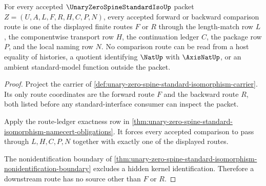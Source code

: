 \begin{theorem}
\label{thm:unary-zero-spine-standard-isomorphism-route-totality}
For every accepted $\UnaryZeroSpineStandardIsoUp$ packet $Z=(U,A,L,F,R,H,C,P,N)$, every accepted forward or backward comparison route is one of the displayed finite routes $F$ or $R$ through the length-match row $L$, the componentwise transport row $H$, the continuation ledger $C$, the package row $P$, and the local naming row $N$. No comparison route can be read from a host equality of histories, a quotient identifying $\NatUp$ with $\AxisNatUp$, or an ambient standard-model function outside the packet.
\end{theorem}
\begin{proof}
Project the carrier of \autoref{def:unary-zero-spine-standard-isomorphism-carrier}. Its only route coordinates are the forward route $F$ and the backward route $R$, both listed before any standard-interface consumer can inspect the packet.

Apply the route-ledger exactness row in \autoref{thm:unary-zero-spine-standard-isomorphism-namecert-obligations}. It forces every accepted comparison to pass through $L,H,C,P,N$ together with exactly one of the displayed routes.

The nonidentification boundary of \autoref{thm:unary-zero-spine-standard-isomorphism-nonidentification-boundary} excludes a hidden kernel identification. Therefore a downstream route has no source other than $F$ or $R$.
\end{proof}

